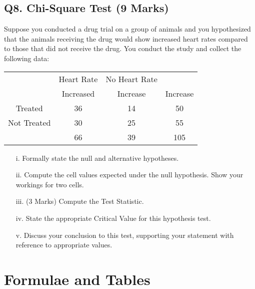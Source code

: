 \documentclass[a4paper,12pt]{article}
\begin{document}
\subsection*{Q8. Chi-Square Test (9 Marks)} %
Suppose you conducted a drug trial on a group of animals and you hypothesized that the animals receiving the drug would show increased heart rates compared to those that did not receive the drug. You conduct the study and collect the following data:
{
	\large
\begin{center}
\begin{tabular}{|c|c|c|c|}
	\hline  & Heart Rate & No Heart Rate  &  \\  
	  & Increased & Increase & Increase \\ 
	\hline Treated  & 36 & 14 & 50 \\ 
	\hline Not Treated & 30 & 25 & 55 \\ 
	\hline  & 66 & 39 & 105 \\ 
	\hline 
\end{tabular} 
\end{center}
}
\begin{itemize}
	\item[i.] Formally state the null and alternative hypotheses.
	\item[ii.]  Compute the cell values expected under the null hypothesis. Show your workings for two cells.
	\item[iii.](3 Marks) Compute the Test Statistic.
	\item[iv.] State the appropriate Critical Value for this hypothesis test.
	\item[v.] Discuss your conclusion to this test, supporting your statement with reference to appropriate values.
\end{itemize}

%

\newpage


\section*{Formulae and Tables}
\end{document}

